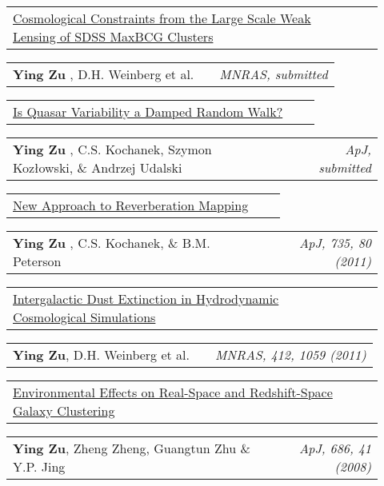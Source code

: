 \documentclass[letterpaper,12pt]{article}
\makeatletter
\newcommand{\toast}[2]{
 \begin{tabular*}{6.5in}{lr@{\extracolsep{\fill}}r} 
     #1          &             &           #2\\
 \end{tabular*}
 \vspace{-6pt}
}
\makeatother
\begin{document}
\begin{description}
\item[]\toast{\href{http://arxiv.org/abs/1207.3794}{Cosmological Constraints from the Large Scale Weak Lensing of SDSS MaxBCG Clusters}}{}
\item[]\toast{\small {\bf Ying Zu} , D.H. Weinberg et al.}{\small \emph{MNRAS, submitted}}
\item[]\toast{\href{http://arxiv.org/abs/1202.3783}{Is Quasar Variability a Damped Random Walk?}}{}
\item[]\toast{\small {\bf Ying Zu} , C.S. Kochanek, Szymon Koz\l{}owski, \&
Andrzej Udalski}{\small \emph{ApJ, submitted}}
\item[]\toast{\href{http://arxiv.org/abs/1008.0641}{New Approach to Reverberation Mapping}}{}
\item[]\toast{\small {\bf Ying Zu} , C.S. Kochanek, \& B.M. Peterson}{\small \emph{ApJ, 735, 80 (2011)}}
\item[]\toast{\href{http://arxiv.org/abs/1005.4406}{Intergalactic Dust
    Extinction in Hydrodynamic Cosmological Simulations}}{}
\item[]\toast{\small {\bf Ying Zu}, D.H. Weinberg et al.}{\small \emph{MNRAS, 412, 1059 (2011)}}
\item[]\toast{\href{http://arxiv.org/abs/0712.3570}{Environmental Effects on Real-Space and Redshift-Space Galaxy Clustering}}{}
\item[]\toast{\small {\bf Ying Zu}, Zheng Zheng, Guangtun Zhu \& Y.P.  Jing}{\small\emph{ApJ, 686, 41 (2008)}}
\end{description}
\end{document}
